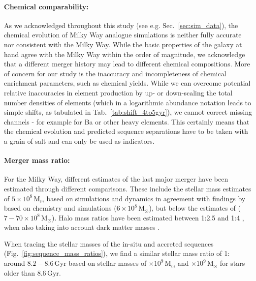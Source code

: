 \documentclass[fleqn,usenatbib]{mnras}
\begin{document}
\paragraph*{Chemical comparability:} As we acknowledged throughout this study (see e.g. Sec.~\ref{sec:sim_data}), the chemical evolution of Milky Way analogue simulations is neither fully accurate nor consistent with the Milky Way. While the basic properties of the galaxy at hand agree with the Milky Way within the order of magnitude, we acknowledge that a different merger history may lead to different chemical compositions. More of concern for our study is the inaccuracy and incompleteness of chemical enrichment parameters, such as chemical yields. While we can overcome potential relative inaccuracies in element production by up- or down-scaling the total number densities of elements (which in a logarithmic abundance notation leads to simple shifts, as tabulated in Tab.~\ref{tab:shift_4to5gyr}), we cannot correct missing channels - for example for Ba or other heavy elements. This certainly means that the chemical evolution and predicted sequence separations have to be taken with a grain of salt and can only be used as indicators.

\paragraph*{Merger mass ratio:} For the Milky Way, different estimates of the last major merger have been estimated through different comparisons. These include the stellar mass estimates of $5\times10^{8}\,\mathrm{M_\odot}$ based on simulations and dynamics \citep{Naidu2021} in agreement with findings by \citet{Helmi2018} based on chemistry and simulations ($6\times 10^{8}\,\mathrm{M_\odot}$), but below the estimates of \citet{Feuillet2020} ($7-70\times10^{8}\,\mathrm{M_\odot}$). Halo mass ratios have been estimated between 1:2.5 \citep{Naidu2020} and 1:4 \citep{Helmi2018}, when also taking into account dark matter masses \citep[e.g. $2\times10^{11}\,\mathrm{M_\odot}$ for][]{Naidu2020}.

When tracing the stellar masses of the in-situ and accreted sequences (Fig.~\ref{fig:sequence_mass_ratios}), we find a similar stellar mass ratio of 1: around $8.2-8.6\,\mathrm{Gyr}$ based on stellar masses of $\times10^9\,\mathrm{M_\odot}$ and $\times10^9\,\mathrm{M_\odot}$ for stars older than $8.6\,\mathrm{Gyr}$.
\end{document}
